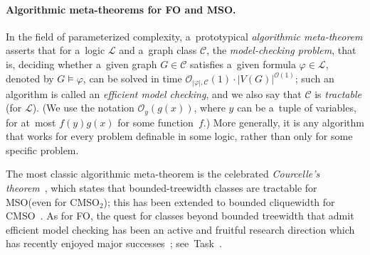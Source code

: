 \documentclass[a4paper,11pt]{article}
\newcommand{\fo}{\textsf{FO}\xspace}
\newcommand{\mso}{\textsf{MSO}\xspace}
\newcommand{\cmso}{\textsf{CMSO}\xspace}
\newcommand{\cmsot}{\textsf{CMSO$_2$}\xspace}
\newcommand{\Oh}{\mathcal{O}}
\begin{document}
\paragraph{Algorithmic meta-theorems for \fo and \mso.}
In the field of parameterized complexity, a~prototypical \emph{algorithmic meta-theorem} asserts that for a~logic $\mathcal{L}$ and a~graph class $\mathcal{C}$, the \emph{model-checking problem}, that is, deciding whether a~given graph $G\in \mathcal{C}$ satisfies a~given formula $\varphi \in \mathcal{L}$, denoted by $G \models \varphi$, can be solved in time $\Oh_{|\varphi|,\mathcal{C}}(1) \cdot |V(G)|^{\Oh(1)}$; such an algorithm is called an \emph{efficient model checking}, and we also say that $ \mathcal{C}$ is \emph{tractable} (for $\mathcal{L}$).
(We use the notation $\Oh_y(g(x))$, where $y$ can be a~tuple of variables, for at~most $f(y) g(x)$ for some function~$f$.) 
More generally, it is any algorithm that works for every problem definable in some logic, rather than only for some specific problem.

The most classic algorithmic meta-theorem is the celebrated \emph{Courcelle's theorem}~\cite{Courcelle90}, which states that bounded-treewidth classes are tractable for \mso (even for \cmsot); this has been extended to bounded cliquewidth for \cmso~\cite{CourcelleMR00}.
As for \fo, the quest for classes beyond bounded treewidth that admit efficient model checking has been an active and fruitful research direction which has recently enjoyed major successes~\cite{GroheKS17dec,twin-width1,twin-width4,DreierEMMPT24mcstable,DreierT25}; see~Task~. 
\end{document}
